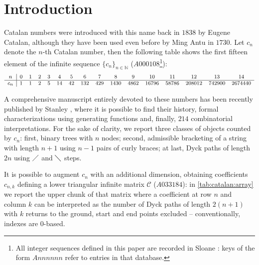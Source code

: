 
\section{Introduction}

\noindent Catalan numbers were introduced with this name back in $1838$ by
Eugene Catalan, although they have been used even before by Ming Antu
in $1730$. Let $c_{n}$ denote the $n$-th Catalan number, then the following
table shows the first fifteen element of the infinite sequence 
$\lbrace c_{n}\rbrace_{n\in\mathbb{N}}$ ($A000108$\footnote{All integer sequences
defined in this paper are recorded in Sloane \cite{sloane:oeis}: keys of
the form $Annnnnn$ refer to entries in that database.}):
\begin{displaymath}
    \footnotesize
    \begin{array}{c|ccccccccccccccc}
        n & 0 & 1 & 2 & 3 & 4 & 5 & 6 & 7 & 8 & 9 & 10 & 11 & 12 & 13 & 14 \\
        \hline
        c_{n} & 1 & 1 & 2 & 5 & 14 & 42 & 132 & 429 & 1430 & 4862 & 16796 & 58786 & 208012 & 742900 & 2674440
    \end{array}
\end{displaymath}

A comprehensive manuscript entirely devoted to these numbers has been recently
published by Stanley \cite{stanley:2015}, where it is possible to find their history,
formal characterizations using generating functions and, finally, $214$ combinatorial 
interpretations.  For the sake of clarity, we report three classes of objects counted by 
$c_{n}$: first, binary trees with $n$ nodes; 
second, admissible bracketing of a string with length $n+1$ using $n-1$ pairs
of curly braces; at last, Dyck paths of length $2n$ using $\diagup$ and $\diagdown$ steps.

It is possible to augment $c_{n}$ with an additional dimension,
obtaining coefficients $c_{n,k}$ defining a lower triangular infinite 
matrix $\mathcal{C}$ ($A033184$): in \autoref{tab:catalan:array} 
we report the upper chunk of that matrix where a coefficient at row $n$ 
and column $k$ can be interpreted as the number
of Dyck paths of length $2(n+1)$ with $k$ returns to the ground, start
and end points excluded -- conventionally, indexes are $0$-based.



